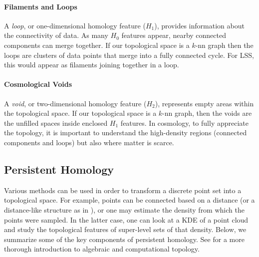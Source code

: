 \documentclass[12pt]{article}
\begin{document}
\paragraph{Filaments and Loops} A \emph{loop}, or one-dimensional homology feature ($H_1$), provides information about the connectivity of data. As many $H_0$ features appear, nearby connected components can merge together. If our topological space is a $k$-nn graph then the loops are clusters of data points that merge into a fully connected cycle.  For LSS, this would appear as filaments joining together in a loop.


\paragraph{Cosmological Voids}  A \emph{void}, or two-dimensional homology feature ($H_2$), represents empty areas within the topological space. If our topological space is a $k$-nn graph, then the voids are the unfilled spaces inside enclosed $H_1$ features.  In cosmology, to fully appreciate the topology, it is important to understand the high-density regions (connected components and loops) but also where matter is scarce.

\subsection{Persistent Homology}
Various methods can be used in order to transform a discrete point set into a topological space. For example, points can be connected based on a distance (or
a distance-like structure as in \citep{chazal2011geometric}), or one may estimate the density from which the points were sampled.
In the latter case, one can look at a KDE of a point cloud and study the topological features of super-level sets of that density. Below, we summarize some of the key components of persistent homology. See \citep{edelsbrunner2010computational,hatcher2002algebraic,munkres1984elements} for a more thorough introduction to algebraic and computational topology.
\end{document}
